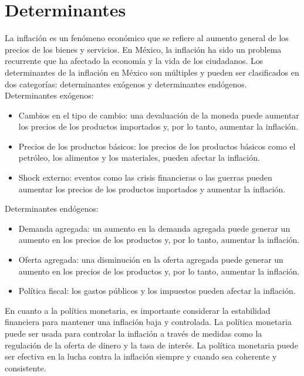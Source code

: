 \section*{Determinantes}



La inflación es un fenómeno económico que se refiere al aumento general de los precios de los bienes y servicios. En México, la inflación ha sido un problema recurrente que ha afectado la economía y la vida de los ciudadanos. Los determinantes de la inflación en México son múltiples y pueden ser clasificados en dos categorías: determinantes exógenos y determinantes endógenos.\\

Determinantes exógenos:\\

\begin{itemize}
    \item   Cambios en el tipo de cambio: una devaluación de la moneda puede aumentar los precios de los productos importados y, por lo tanto, aumentar la inflación.
        
    \item   Precios de los productos básicos: los precios de los productos básicos como el petróleo, los alimentos y los materiales, pueden afectar la inflación.
            
    \item   Shock externo: eventos como las crisis financieras o las guerras pueden aumentar los precios de los productos importados y aumentar la inflación.
\end{itemize}


Determinantes endógenos:
\begin{itemize}
    \item   Demanda agregada: un aumento en la demanda agregada puede generar un aumento en los precios de los productos y, por lo tanto, aumentar la inflación.
    \item   Oferta agregada: una disminución en la oferta agregada puede generar un aumento en los precios de los productos y, por lo tanto, aumentar la inflación.
    \item   Política fiscal: los gastos públicos y los impuestos pueden afectar la inflación.
\end{itemize}



En cuanto a la política monetaria, es importante considerar la estabilidad financiera para mantener una inflación baja y controlada. La política monetaria puede ser usada para controlar la inflación a través de medidas como la regulación de la oferta de dinero y la tasa de interés. La política monetaria puede ser efectiva en la lucha contra la inflación siempre y cuando sea coherente y consistente.\\

